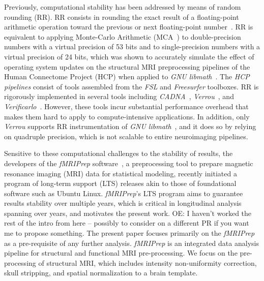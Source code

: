 \documentclass[lettersize,journal]{IEEEtran}
\newcommand{\oesteban}[1]{\color{orange}\textsc{OE:} #1\color{black}\xspace}
\newcommand{\fmriprep}{\emph{fMRIPrep}\xspace}
\begin{document}
Previously, computational stability has been addressed by means of random rounding (RR).
RR consists in rounding the exact result of a floating-point arithmetic operation toward the previous
  or next floating-point number~\cite{forsythe1959reprint}.
RR is equivalent to applying Monte-Carlo Arithmetic (MCA~\cite{parker1997monte}) to double-precision numbers
  with a virtual precision of 53 bits and to single-precision numbers with a virtual precision of 24 bits,
  which was shown to accurately simulate the effect of operating system updates on the structural
  MRI preprocessing pipelines of the Human Connectome Project (HCP) when applied to 
  \emph{GNU libmath}~\cite{salari2021accurate}.
The \emph{HCP pipelines} consist of tools assembled from the \emph{FSL} and \emph{Freesurfer} toolboxes.
RR is rigorously implemented in several tools including \emph{CADNA}~\cite{jezequel2008cadna},
  \emph{Verrou}~\cite{fevotte2016verrou}, and \emph{Verificarlo}~\cite{denis2016verificarlo}.
However, these tools incur substantial performance overhead that makes them hard to apply to
  compute-intensive applications.
In addition, only \emph{Verrou} supports RR instrumentation of \emph{GNU libmath}~\cite{fevotte2019debugging},
  and it does so by relying on quadruple precision, which is not scalable to entire neuroimaging pipelines.

Sensitive to these computational challenges to the stability of results, 
  the developers of the \fmriprep software~\cite{esteban2019fmriprep}, a preprocessing tool to
  prepare magnetic resonance imaging (MRI) data for statistical modeling,
  recently initiated a program of long-term support (LTS) releases akin to those of foundational
  software such as Ubuntu Linux.
\fmriprep's LTS program aims to guarantee results stability over multiple years, which is critical
  in longitudinal analysis spanning over years, and motivates
  the present work.
\oesteban{I haven't worked the rest of the intro from here --
  possibly to consider on a different PR if you want me to
  propose something.}
The present paper focuses primarily on the \fmriprep as a pre-requisite of any further analysis. \fmriprep is an integrated data analysis pipeline for structural and functional MRI pre-processing. We focus on the pre-processing of structural MRI, which includes intensity non-uniformity correction, skull stripping, and spatial normalization to a brain template.
\end{document}
